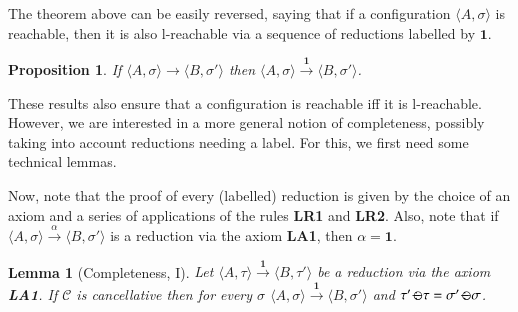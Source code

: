 \documentclass[preprint,12pt]{elsarticle}
\newtheorem{lemma}{Lemma}
\newtheorem{proposition}{Proposition}
\def\1{{\mathbf 1}}
\def\C{{\mathcal C}}
\newcommand{\comment}[1]{}
\def\monid{{\mathbf 0}}
\def\1{{\mathbf 1}}
\def\C{{\mathcal C}}
\def\odiv{\, {\ominus\hspace{-7.7pt} \div} \,}
\def\monid{\mathbf{1}}
\begin{document}
The theorem above can be easily reversed, saying that if a configuration $\langle A, \sigma \rangle$ is reachable,
then it is also l-reachable via a sequence of reductions labelled by $\monid$.

\begin{proposition}
	\label{idred}
	If %
	$\langle A, \sigma \rangle \to \langle B, \sigma' \rangle$
	then %
	$\langle A, \sigma \rangle \xrightarrow{\monid}  \langle B, \sigma' \rangle$.
\end{proposition}



These results also ensure that a configuration is reachable iff it is l-reachable.
%
However, we are interested in a more general notion of completeness, possibly taking into account 
reductions needing a label. For this, we first need some technical lemmas.
%
\comment{
	\begin{lemma}
		\label{minor}
		Let $\langle A, \tau \rangle$ be a reachable configuration such that
		$\sigma \leq \tau$. If $\C$ is invertible then $\langle A, \sigma \rangle$ is a reachable configuration.
		Moreover, if  $\langle A, \tau \rangle \to \langle B, \tau' \rangle$ then
		$\langle A, \sigma \rangle \to \langle B', \sigma' \rangle$ 
		with $\sigma' = \tau' \otimes (\sigma \odiv \tau)$.
		Furthermore, if $\C$ is also cancellative then $B = B'$.
	\end{lemma}
}
%

Now, note that the proof of every (labelled) reduction is given by the choice of an axiom 
and a series of applications of the rules {\bf LR1} and  {\bf LR2}.
Also, note that if 
$\langle A, \sigma \rangle \xrightarrow{\alpha} \langle B, \sigma' \rangle$ is a reduction 
via the axiom {\bf LA1}, then $\alpha = \1$.

\begin{lemma}[Completeness, I]
	\label{LA1}
	Let $\langle A, \tau \rangle \xrightarrow{\monid} \langle B, \tau' \rangle$ be a reduction 
	via the axiom {\bf LA1}. 
	If $\C$ is cancellative then 
	for every $\sigma$
	$\langle A, \sigma \rangle \xrightarrow{\monid} \langle B, \sigma' \rangle$
	and $\tau' \odiv \tau = \sigma' \odiv \sigma$.
\end{lemma}


\comment{
	\begin{lemma}
		\label{riminor}
		Let $\langle A, \tau \rangle \xrightarrow{\beta} \langle B, \tau' \rangle$ with $\alpha \leq \beta$. 
		If $\beta \neq \monid$ then $\langle A, \tau \rangle \xrightarrow{\alpha} \langle B, \tau' \otimes (\alpha \odiv \beta) \rangle$.
	\end{lemma}
	
	\todo{questo lemma ora serve?}
	The lemma just states that the label in a reduction can always be strengthened,
	as long as rule  {\bf LA1} is not used in the reduction labelled by $\beta$.
	The proof exploits the premise of rule {\bf LA2} together with Lemma~\ref{l-mono},
	and the condition $\beta \neq \monid$ is required in the inductive step for rule  {\bf LR2}.
}
\end{document}
